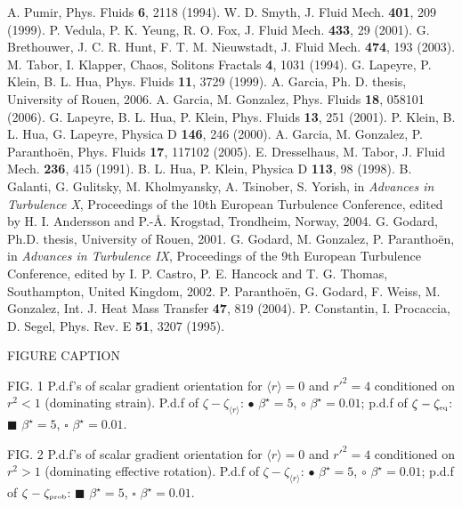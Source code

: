 \documentclass[doublespacing]{elsart}
\begin{document}
\begin{thebibliography}{00}
A. Pumir, 
Phys. Fluids {\bf 6}, 2118 (1994).
W. D. Smyth, 
J. Fluid Mech. {\bf 401}, 209 (1999).
P. Vedula, P. K. Yeung, R. O. Fox,
J. Fluid Mech. {\bf 433}, 29 (2001).
G. Brethouwer, J. C. R. Hunt, F. T. M. Nieuwstadt,
J. Fluid Mech. {\bf 474}, 193 (2003).
M. Tabor, I. Klapper, 
Chaos, Solitons Fractals {\bf 4}, 1031 (1994).
G. Lapeyre, P. Klein, B. L. Hua,
Phys. Fluids {\bf 11}, 3729 (1999).
A. Garcia, Ph. D. thesis, University of Rouen, 2006.
A. Garcia, M. Gonzalez,
Phys. Fluids {\bf 18}, 058101 (2006).
G. Lapeyre, B. L. Hua, P. Klein,
Phys. Fluids {\bf 13}, 251 (2001).
P. Klein, B. L. Hua, G. Lapeyre,
Physica D {\bf 146}, 246 (2000).
A. Garcia, M. Gonzalez, P. Parantho\"en,
Phys. Fluids {\bf 17}, 117102 (2005).
E. Dresselhaus, M. Tabor,
J. Fluid Mech. {\bf 236}, 415 (1991).
B. L. Hua, P. Klein,
Physica D {\bf 113}, 98 (1998).
B. Galanti, G. Gulitsky, M. Kholmyansky, A. Tsinober, S. Yorish,
in {\em Advances in Turbulence X}, Proceedings of the 
10th European Turbulence Conference, edited by H. I. Andersson
and P.-\AA. Krogstad, Trondheim, Norway, 2004.
G. Godard, 
Ph.D. thesis, University of Rouen, 2001.
G. Godard, M. Gonzalez, P. Parantho\"en,
in {\em Advances in Turbulence IX}, Proceedings of the 
9th European Turbulence Conference, edited by 
I. P. Castro, P. E. Hancock and T. G. Thomas,
Southampton, United Kingdom, 2002.
P. Parantho\"en, G. Godard, F. Weiss, M. Gonzalez,
Int. J. Heat Mass Transfer {\bf 47}, 819 (2004).
P. Constantin, I. Procaccia, D. Segel,
Phys. Rev. E {\bf 51}, 3207 (1995).
\end{thebibliography}

\newpage
\centerline{FIGURE CAPTION}

\bigskip

\noindent
FIG. 1
P.d.f's of scalar gradient orientation for
$ \langle r \rangle = 0 $ and $ r'^2 = 4 $
conditioned on $ r^2 < 1 $
(dominating strain).
P.d.f of $ \zeta - \zeta_{\langle r \rangle}$:
$ \bullet $
$ \beta^{\star} = 5 $,
$ \circ $
$ \beta^{\star} = 0.01 $;
p.d.f of $ \zeta - \zeta_{\mbox{\tiny eq}}$:
$ \blacksquare $
$ \beta^{\star} = 5 $,
$ \square $
$ \beta^{\star} = 0.01 $.

\bigskip

\noindent
FIG. 2
P.d.f's of scalar gradient orientation for
$ \langle r \rangle = 0 $ and $ r'^2 = 4 $
conditioned on $ r^2 > 1 $
(dominating effective rotation).
P.d.f of $ \zeta - \zeta_{\langle r \rangle}$:
$ \bullet $
$ \beta^{\star} = 5 $,
$ \circ $
$ \beta^{\star} = 0.01 $;
p.d.f of $ \zeta - \zeta_{\mbox{\tiny prob}}$:
$ \blacksquare $
$ \beta^{\star} = 5 $,
$ \square $
$ \beta^{\star} = 0.01 $.
\end{document}
